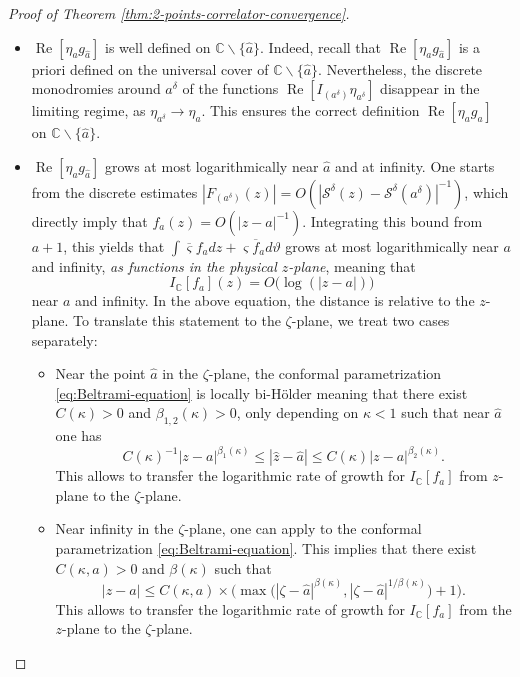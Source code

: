 \documentclass[reqno]{amsart}
\numberwithin{equation}{section}
\theoremstyle{definition}
\theoremstyle{remark}
\newcommand\C{\mathbb{C}}
\renewcommand\Re{\operatorname{Re}}
\newcommand\cS{\mathcal{S}}
\begin{document}
\begin{proof}[Proof of Theorem \ref{thm:2-points-correlator-convergence}]
\begin{itemize}
	\item $\Re[\eta_a g_{\hat{a}}]$ is well defined on $\C \backslash \{ \hat{a} \}$. Indeed, recall that $\Re[\eta_a g_{\hat{a}}]$ is a priori defined on the universal cover of $\mathbb{C}\backslash \{ \hat{a} \}$. Nevertheless, the discrete  monodromies around $a^\delta$ of the functions $\Re[I_{(a^\delta)}\eta_{a^\delta}]$ disappear in the limiting regime, as $\eta_{a^\delta}\to \eta_a$. This ensures the correct definition $\Re[\eta_a g_{\hat{a}}]$ on $\C \backslash \{ \hat{a} \}$. 
	\item $\Re[\eta_a g_{\hat{a}}]$ grows at most logarithmically near $\hat{a}$ and at infinity. One starts from the discrete estimates $|F_{(a^\delta)}(z)| = O(|\cS^\delta (z)-\cS^\delta(a^\delta)|^{-1})$, which directly imply that $f_a(z)=O(|z-a|^{-1})$. Integrating this bound from $a+1$, this yields that $\int  \overline{\varsigma} f_a dz + \varsigma \overline{f}_a d\vartheta $ grows at most logarithmically near $a$ and infinity, \emph{as functions in the physical $z$-plane}, meaning that 
\begin{equation*}
	I_\mathbb{C}[f_a](z) = O\Big( \log(|z-a |) \Big)
\end{equation*}
near $a$ and infinity. In the above equation, the distance is relative to the $z$-plane. To translate this statement to the $\zeta$-plane, we treat two cases separately:
\begin{itemize}
\item Near the point $\hat{a}$ in the $\zeta$-plane, the conformal parametrization \eqref{eq:Beltrami-equation} is locally bi-H\"older meaning that there exist $C(\kappa)>0$ and $\beta_{1,2}(\kappa)>0$, only depending on $\kappa <1 $ such that near $\hat{a}$ one has
\begin{equation*}
	C(\kappa)^{-1} |z-a|^{\beta_1(\kappa)} \leq |\hat{z}-\hat{a}| \leq C(\kappa) |z-a|^{\beta_2(\kappa)}.
\end{equation*}
This allows to transfer the logarithmic rate of growth for $I_{\mathbb{C}}[f_a] $ from $z$-plane to the $\zeta$-plane.
\item Near infinity in the $\zeta$-plane,  one can apply \cite[Variant of Theorem 5.1]{Bhayo2010} to the conformal parametrization \eqref{eq:Beltrami-equation}. This implies that there exist $C(\kappa,a)>0$ and $\beta(\kappa)$ such that 
\begin{equation*}
	| z-a |  \leq C(\kappa,a) \times \Bigg( \max \Big( |\zeta-\hat{a}|^{\beta(\kappa)}, |\zeta-\hat{a}|^{1/\beta(\kappa)} \Big) +1\Bigg).
\end{equation*}
This allows to transfer the logarithmic rate of growth for $I_{\mathbb{C}}[f_a] $ from the $z$-plane to the $\zeta$-plane.
\end{itemize}


\end{itemize}
\end{proof}
\end{document}
